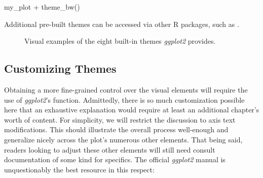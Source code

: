 \begin{inR}
my_plot + theme_bw()
\end{inR}

\vspace{1em}

\noindent
Additional pre-built themes can be accessed via other R packages, such as .

\vspace{2em}

\begin{figure}[h]
\centering
{}
\caption{Visual examples of the eight built-in themes \textit{ggplot2} provides.}
\label{fig:gg_built-in-themes}
\end{figure}

\vspace{1em}

\subsection{Customizing Themes}

Obtaining a more fine-grained control over the visual elements will require the use of \textit{ggplot2}'s  function. Admittedly, there is so much customization possible here that an exhaustive explanation would require at least an additional chapter's worth of content. For simplicity, we will restrict the discussion to axis text modifications. This should illustrate the overall process well-enough and generalize nicely across the plot's numerous other elements. That being said, readers looking to adjust these other elements will still need consult documentation of some kind for specifics. The official \textit{ggplot2} manual is unquestionably the best resource in this respect:

